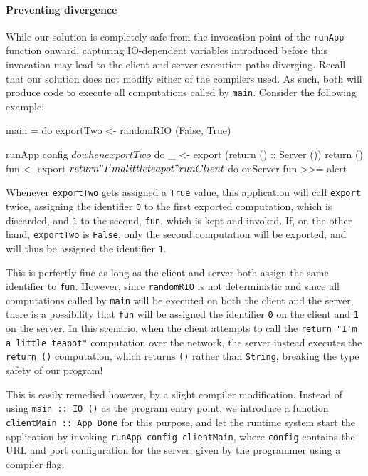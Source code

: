 \documentclass[preprint]{sigplanconf}
\begin{document}
\paragraph{Preventing divergence} While our solution is completely safe from
the invocation point of the \lstinline!runApp! function onward, capturing
IO-dependent variables introduced before this invocation may lead to the client
and server execution paths diverging. Recall that our solution does not modify
either of the compilers used. As such, both will produce code to execute all
computations called by \lstinline!main!. Consider the following example:

\begin{code}
main = do
  exportTwo <- randomRIO (False, True)

  runApp config $ do
    when exportTwo $ do
      _ <- export (return () :: Server ())
      return ()
    fun <- export $ return "I'm a little teapot"

    runClient $ do
      onServer fun >>= alert
\end{code}

Whenever \lstinline!exportTwo! gets assigned a \lstinline!True! value, this
application will call \lstinline!export! twice, assigning the identifier
\lstinline!0! to the first exported computation, which is discarded, and
\lstinline!1! to the second, \lstinline!fun!, which is kept and invoked.
If, on the other hand, \lstinline!exportTwo! is \lstinline!False!,
only the second computation will be exported, and will thus be assigned the
identifier \lstinline!1!.

This is perfectly fine as long as the client and server both assign the
same identifier to \lstinline!fun!. However, since \lstinline!randomRIO! is
not deterministic and since all computations called by \lstinline!main! will be
executed on both the client and the server, there is a possibility that
\lstinline!fun! will be assigned the identifier \lstinline!0! on the client and
\lstinline!1! on the server. In this scenario, when the client attempts to call
the \lstinline!return "I'm a little teapot"! computation over the network,
the server instead executes the \lstinline!return ()! computation, which
returns \lstinline!()! rather than \lstinline!String!, breaking the type safety
of our program!

This is easily remedied however, by a slight compiler modification. Instead of
using \lstinline!main :: IO ()! as the program entry point, we introduce a
function \lstinline!clientMain :: App Done! for this purpose, and let the runtime
system start the application by invoking \lstinline!runApp config clientMain!,
where \lstinline!config! contains the URL and port configuration for the
server, given by the programmer using a compiler flag.
\end{document}
